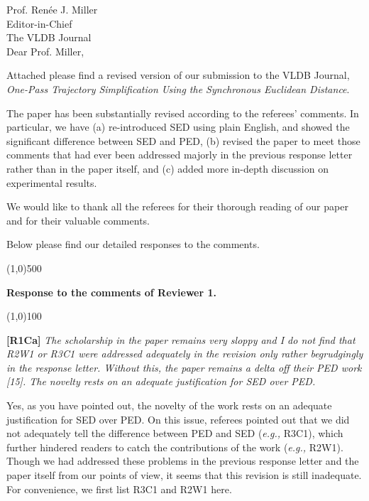 \documentclass{letter}
\newcommand{\eg}{\emph{e.g.,}\xspace}
\begin{document}
Prof. {Ren{\'{e}}e J. Miller} \\
Editor-in-Chief		\\
The VLDB Journal	\\



Dear Prof. Miller,

Attached please find a revised version of our submission to
the VLDB Journal, \emph{One-Pass Trajectory Simplification Using the Synchronous Euclidean Distance}.


{The paper has been substantially revised according to the referees' comments. In particular, we have (a) re-introduced SED using plain English, and showed the significant difference between SED and PED, (b) revised the paper to meet those comments that had ever been addressed majorly in the previous response letter rather than in the paper itself, and (c) added more in-depth discussion on experimental results.}

We would like to thank all the referees for their thorough reading of our paper and for their valuable comments.

Below please find our detailed responses to the comments.



\line(1,0){500}

\textbf{Response to the comments of Reviewer 1.}

\line(1,0){100}


\textbf{[R1Ca]} \emph{The scholarship in the paper remains very sloppy and I do not find that {R2W1} or {R3C1} were addressed adequately in the revision only rather begrudgingly in the response letter. Without this, the paper remains a delta off their PED work [15]. The novelty rests on an adequate justification for SED over PED.}

Yes, as you have pointed out, the novelty of the work rests on an adequate justification for SED over PED. On this issue, referees pointed out that we did not adequately tell the difference between PED and SED (\eg R3C1), which further hindered readers to catch the contributions of the work (\eg R2W1). Though we had addressed these problems in the previous response letter and the paper itself from our points of view, it seems that this revision is still inadequate. For convenience, we first list R3C1 and R2W1 here.
\end{document}
